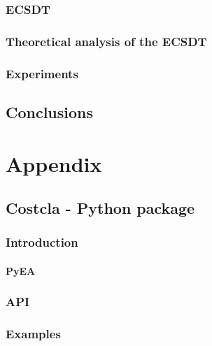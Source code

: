 \documentclass[twoside,openright,titlepage,numbers=noenddot,headinclude,%
               footinclude=true,cleardoublepage=empty,abstractoff,BCOR=5mm,%
               paper=a4,fontsize=11pt,ngerman,american,doublespace]{scrreprt}
\numberwithin{theorem}{chapter}
\numberwithin{definition}{chapter}
\numberwithin{algorithm}{chapter}
\numberwithin{figure}{chapter}
\numberwithin{table}{chapter}
\numberwithin{equation}{chapter}
\begin{document}
		\section{ECSDT}
		\section{Theoretical analysis of the ECSDT}
		\section{Experiments}
			
% 
% 
% 
 
\cleardoublepage
\makeatletter
\def\toclevel@chapter{-1}
\makeatother
\chapter{Conclusions}

\appendix
\cleardoublepage
\part{Appendix}
	\chapter{Costcla - Python package}
		\section{Introduction}
			\subsection{PyEA}
		\section{API}
		\section{Examples}

	\cleardoublepage

\cleardoublepage
\end{document}
